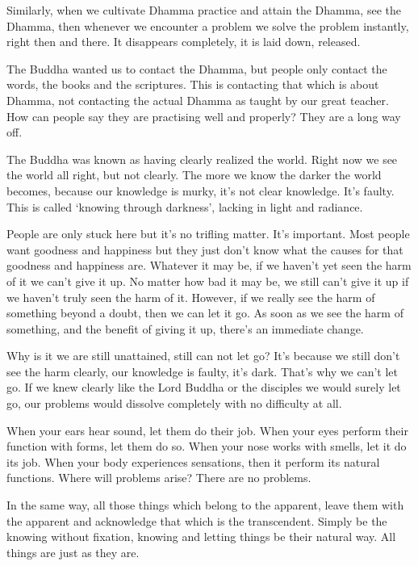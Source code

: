 Similarly, when we cultivate Dhamma practice and attain the Dhamma, see the Dhamma, then whenever we encounter a problem we solve the problem instantly, right then and there. It disappears completely, it is laid down, released. 

The Buddha wanted us to contact the Dhamma, but people only contact the words, the books and the scriptures. This is contacting that which is about Dhamma, not contacting the actual Dhamma as taught by our great teacher. How can people say they are practising well and properly? They are a long way off. 

The Buddha was known as  having clearly realized the world. Right now we see the world all right, but not clearly. The more we know the darker the world becomes, because our knowledge is murky, it's not clear knowledge. It's faulty. This is called `knowing through darkness', lacking in light and radiance. 

People are only stuck here but it's no trifling matter. It's important. Most people want goodness and happiness but they just don't know what the causes for that goodness and happiness are. Whatever it may be, if we haven't yet seen the harm of it we can't give it up. No matter how bad it may be, we still can't give it up if we haven't truly seen the harm of it. However, if we really see the harm of something beyond a doubt, then we can let it go. As soon as we see the harm of something, and the benefit of giving it up, there's an immediate change. 

Why is it we are still unattained, still can not let go? It's because we still don't see the harm clearly, our knowledge is faulty, it's dark. That's why we can't let go. If we knew clearly like the Lord Buddha or the  disciples we would surely let go, our problems would dissolve completely with no difficulty at all. 

When your ears hear sound, let them do their job. When your eyes perform their function with forms, let them do so. When your nose works with smells, let it do its job. When your body experiences sensations, then it perform its natural functions. Where will problems arise? There are no problems. 

In the same way, all those things which belong to the apparent, leave them with the apparent and acknowledge that which is the transcendent. Simply be the  knowing without fixation, knowing and letting things be their natural way. All things are just as they are. 

